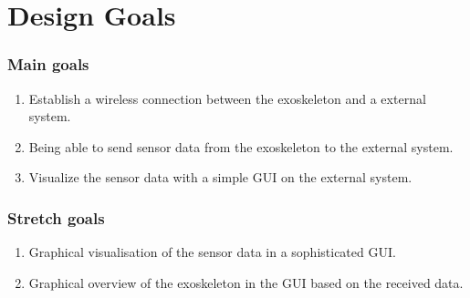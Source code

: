 \section{Design Goals}
\subsubsection{Main goals}
\begin{enumerate}
	\item Establish a wireless connection between the exoskeleton and a external system.
	\item Being able to send sensor data from the exoskeleton to the external system.
	\item Visualize the sensor data with a simple GUI on the external system.
\end{enumerate}

\subsubsection{Stretch goals}
\begin{enumerate}
	\item Graphical visualisation of the sensor data in a sophisticated GUI. 
	\item Graphical overview of the exoskeleton in the GUI based on the received data.
\end{enumerate}